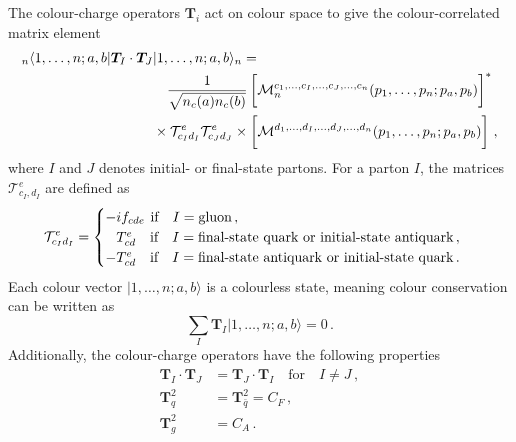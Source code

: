 \documentclass[main.tex]{subfiles}
\begin{document}
    The colour-charge operators $\bm{T}_{i}$ act on colour space
    to give the colour-correlated matrix element
    \begin{equation}
        \label{eqn:charge_operator}
        \begin{split}
            {}_{n} \langle 1, \ldots, n ; a, b | \bm{T}_{I} \cdot \bm{T}_{J} &| 1, \ldots, n ; a, b \rangle_{n} = \\
            & \quad \dfrac{1}{\sqrt{n_{c}(a)n_{c}(b)}} \left[ \vphantom{\dfrac{1}{1}} \mathcal{M}_{n}^{c_{1},\ldots,c_{I},\ldots,c_{J},\ldots,c_{n}}(p_{1},\ldots,p_{n};p_{a},p_{b}) \right]^{*} \\
            &\times \mathcal{T}^{e}_{c_{I}d_{I}}\mathcal{T}^{e}_{c_{J}d_{J}} \times \left[ \vphantom{\dfrac{1}{1}} \mathcal{M}^{d_{1},\ldots,d_{I},\ldots,d_{J},\ldots,d_{n}}(p_{1},\ldots,p_{n};p_{a},p_{b})\right] \, ,
        \end{split}
    \end{equation}
    where $I$ and $J$ denotes initial- or final-state partons.
    For a parton $I$, the matrices $\mathcal{T}^{e}_{c_{I},d_{I}}$ are defined as
    \begin{equation}
        \mathcal{T}^{e}_{c_{I}d_{I}} =
        \begin{cases}
            -i f_{cde} \hspace{-6pt} \quad \text{if} \quad I = \text{gluon} \, , \\
            \hphantom{-} T^{e}_{cd} \quad \text{if} \quad I = \text{final-state quark or initial-state antiquark} \, , \\
            -T^{e}_{cd} \quad \text{if} \quad I = \text{final-state antiquark or initial-state quark} \, .
        \end{cases}
    \end{equation}
    Each colour vector $|1, \ldots, n; a, b \rangle$ is a colourless
    state, meaning colour conservation can be written as
    \begin{equation}
        \sum_{I} \bm{T}_{I} |1, \ldots, n; a, b \rangle = 0 \, .
    \end{equation}
    Additionally, the colour-charge operators have the following properties
    \begin{align}
        \bm{T}_{I} \cdot \bm{T}_{J} &= \bm{T}_{J} \cdot \bm{T}_{I} \quad \text{for} \quad I \neq J \, , \nonumber \\
        \bm{T}^{2}_{q} &= \bm{T}^{2}_{\bar{q}} = C_{F} \, ,\\
        \bm{T}^{2}_{g} &= C_{A} \, . \nonumber
    \end{align}
\end{document}
